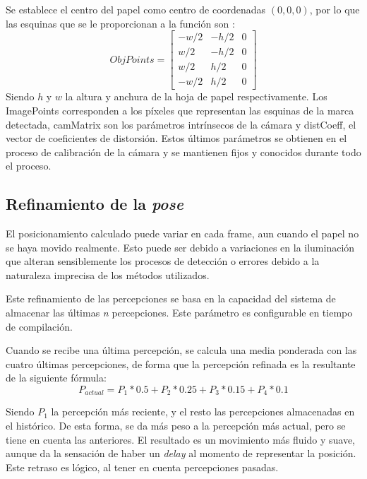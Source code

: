 Se establece el centro del papel como centro de coordenadas $(0,0,0)$, por lo que las esquinas que se le proporcionan a la función son :
\begin{equation}
ObjPoints =\begin{bmatrix} -w/2 & -h/2 & 0 \\
                            w/2 & -h/2 & 0 \\
                            w/2 &  h/2 & 0 \\
                           -w/2 &  h/2 & 0
\end{bmatrix}
\end{equation}
Siendo $h$ y $w$ la altura y anchura de la hoja de papel respectivamente. Los ImagePoints corresponden a los píxeles que
representan las esquinas de la marca detectada, camMatrix son los parámetros intrínsecos de la
cámara y distCoeff, el vector de coeficientes de distorsión. Estos últimos parámetros se obtienen en
el proceso de calibración de la cámara y se mantienen fijos y conocidos durante todo el proceso.

\subsection{Refinamiento de la \emph{pose}}
El posicionamiento calculado puede variar en cada frame, aun cuando el papel no se haya movido
realmente. Esto puede ser debido a variaciones en la iluminación que alteran sensiblemente los
procesos de detección o errores debido a la naturaleza imprecisa de los métodos utilizados.

Este refinamiento de las percepciones se basa en la capacidad del sistema de almacenar las últimas
\textit{n} percepciones. Este parámetro es configurable en tiempo de compilación.


Cuando se recibe una última percepción, se calcula una media ponderada con las cuatro últimas
percepciones, de forma que la percepción refinada es la resultante de la siguiente fórmula:
\begin{equation}
P_{actual} = P_1*0.5 + P_2*0.25 + P_3*0.15 + P_4*0.1
\end{equation}

Siendo $P_1$ la percepción más reciente, y el resto las percepciones almacenadas en el histórico. De esta forma, se da más peso a la percepción más actual, pero se tiene en cuenta las anteriores. El resultado es un movimiento más fluido y suave, aunque da la sensación de haber un \textit{delay} al momento de representar la posición. Este retraso es lógico, al tener en cuenta percepciones pasadas.

